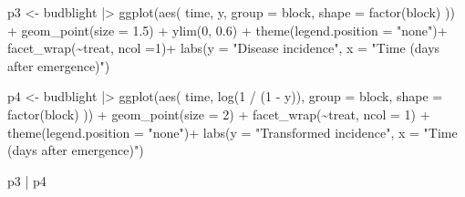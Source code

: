 \documentclass[
  letterpaper,
  DIV=11,
  numbers=noendperiod]{scrreprt}
\newenvironment{Shaded}{\begin{snugshade}}{\end{snugshade}}
\newcommand{\AttributeTok}[1]{\textcolor[rgb]{0.40,0.45,0.13}{#1}}
\newcommand{\DecValTok}[1]{\textcolor[rgb]{0.68,0.00,0.00}{#1}}
\newcommand{\FloatTok}[1]{\textcolor[rgb]{0.68,0.00,0.00}{#1}}
\newcommand{\FunctionTok}[1]{\textcolor[rgb]{0.28,0.35,0.67}{#1}}
\newcommand{\NormalTok}[1]{\textcolor[rgb]{0.00,0.23,0.31}{#1}}
\newcommand{\OtherTok}[1]{\textcolor[rgb]{0.00,0.23,0.31}{#1}}
\newcommand{\SpecialCharTok}[1]{\textcolor[rgb]{0.37,0.37,0.37}{#1}}
\newcommand{\StringTok}[1]{\textcolor[rgb]{0.13,0.47,0.30}{#1}}
\begin{document}
\begin{Shaded}
\begin{Highlighting}[]
\NormalTok{p3 }\OtherTok{\textless{}{-}}\NormalTok{ budblight }\SpecialCharTok{|\textgreater{}}
  \FunctionTok{ggplot}\NormalTok{(}\FunctionTok{aes}\NormalTok{(}
\NormalTok{    time, y,}
    \AttributeTok{group =}\NormalTok{ block,}
    \AttributeTok{shape =} \FunctionTok{factor}\NormalTok{(block)}
\NormalTok{  )) }\SpecialCharTok{+}
  \FunctionTok{geom\_point}\NormalTok{(}\AttributeTok{size =} \FloatTok{1.5}\NormalTok{) }\SpecialCharTok{+}
  \FunctionTok{ylim}\NormalTok{(}\DecValTok{0}\NormalTok{, }\FloatTok{0.6}\NormalTok{) }\SpecialCharTok{+}
  \FunctionTok{theme}\NormalTok{(}\AttributeTok{legend.position =} \StringTok{"none"}\NormalTok{)}\SpecialCharTok{+}
  \FunctionTok{facet\_wrap}\NormalTok{(}\SpecialCharTok{\textasciitilde{}}\NormalTok{treat, }\AttributeTok{ncol =}\DecValTok{1}\NormalTok{)}\SpecialCharTok{+}
  \FunctionTok{labs}\NormalTok{(}\AttributeTok{y =} \StringTok{"Disease incidence"}\NormalTok{,}
       \AttributeTok{x =} \StringTok{"Time (days after emergence)"}\NormalTok{)}
\end{Highlighting}
\end{Shaded}

\begin{Shaded}
\begin{Highlighting}[]
\NormalTok{p4 }\OtherTok{\textless{}{-}}\NormalTok{ budblight }\SpecialCharTok{|\textgreater{}}
  \FunctionTok{ggplot}\NormalTok{(}\FunctionTok{aes}\NormalTok{(}
\NormalTok{    time, }\FunctionTok{log}\NormalTok{(}\DecValTok{1} \SpecialCharTok{/}\NormalTok{ (}\DecValTok{1} \SpecialCharTok{{-}}\NormalTok{ y)),}
    \AttributeTok{group =}\NormalTok{ block,}
    \AttributeTok{shape =} \FunctionTok{factor}\NormalTok{(block)}
\NormalTok{  )) }\SpecialCharTok{+}
  \FunctionTok{geom\_point}\NormalTok{(}\AttributeTok{size =} \DecValTok{2}\NormalTok{) }\SpecialCharTok{+}
  \FunctionTok{facet\_wrap}\NormalTok{(}\SpecialCharTok{\textasciitilde{}}\NormalTok{treat, }\AttributeTok{ncol =} \DecValTok{1}\NormalTok{) }\SpecialCharTok{+}
  \FunctionTok{theme}\NormalTok{(}\AttributeTok{legend.position =} \StringTok{"none"}\NormalTok{)}\SpecialCharTok{+}
  \FunctionTok{labs}\NormalTok{(}\AttributeTok{y =} \StringTok{"Transformed incidence"}\NormalTok{, }\AttributeTok{x =} \StringTok{"Time (days after emergence)"}\NormalTok{)}

\NormalTok{p3 }\SpecialCharTok{|}\NormalTok{ p4}
\end{Highlighting}
\end{Shaded}
\end{document}
